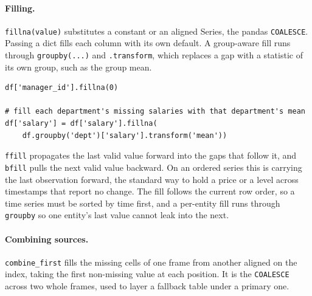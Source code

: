 \vspace{-1ex}

\paragraph{Filling.} \texttt{fillna(value)} substitutes a constant or an aligned Series, the pandas \texttt{COALESCE}. Passing a dict fills each column with its own default. A group-aware fill runs through \texttt{groupby(...)} and \texttt{.transform}, which replaces a gap with a statistic of its own group, such as the group mean.

\begin{lstlisting}[style=python, caption={Constant fill and group-relative fill}]
df['manager_id'].fillna(0)

# fill each department's missing salaries with that department's mean
df['salary'] = df['salary'].fillna(
    df.groupby('dept')['salary'].transform('mean'))
\end{lstlisting}

\vspace{2ex}

\begin{keybox}
\texttt{ffill} propagates the last valid value forward into the gaps that follow it, and \texttt{bfill} pulls the next valid value backward. On an ordered series this is carrying the last observation forward, the standard way to hold a price or a level across timestamps that report no change. The fill follows the current row order, so a time series must be sorted by time first, and a per-entity fill runs through \texttt{groupby} so one entity's last value cannot leak into the next.
\end{keybox}

\vspace{-2ex}

\paragraph{Combining sources.} \texttt{combine\_first} fills the missing cells of one frame from another aligned on the index, taking the first non-missing value at each position. It is the \texttt{COALESCE} across two whole frames, used to layer a fallback table under a primary one.

